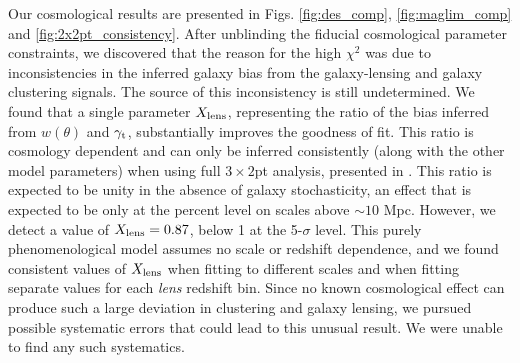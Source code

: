 \documentclass[aps, prd,twocolumn,superscriptaddress,nofootinbib,preprintnumbers]{revtex4-1}
\newcommand{\redmagic}{\texttt{redMaGiC} }
\begin{document}
Our cosmological results are presented in Figs. \ref{fig:des_comp}, \ref{fig:maglim_comp} and \ref{fig:2x2pt_consistency}. After unblinding the fiducial cosmological parameter constraints, we discovered that the reason for the high $\chi^2$ was due to inconsistencies in the inferred galaxy bias from the galaxy-lensing and galaxy clustering signals.  The source of this inconsistency is still undetermined. We found that a single parameter $X_{\rm lens}$, representing the ratio of the bias inferred from $w(\theta)$ and $\gamma_{\rm t}$, substantially improves the goodness of fit. This ratio is cosmology dependent and can only be inferred consistently (along with the other model parameters)  when using full $3\times2$pt analysis, presented in \citet*{y3-3x2ptkp}.
This ratio is expected to be unity in the absence of galaxy stochasticity, an effect that is expected to be only at the percent level on scales above $\sim 10$ Mpc. However, we detect a value of $X_{\rm lens}=0.87$, below 1 at the 5-$\sigma$ level. This purely phenomenological model assumes no scale or redshift dependence, and we found consistent values of $X_{\rm lens}$ when fitting to different scales and when fitting separate values for each \emph{lens} redshift bin. 
Since no known cosmological effect can produce such a large deviation in clustering and galaxy lensing, we pursued possible systematic errors that could lead to this unusual result. 
We were unable to find any such systematics.  
\end{document}
